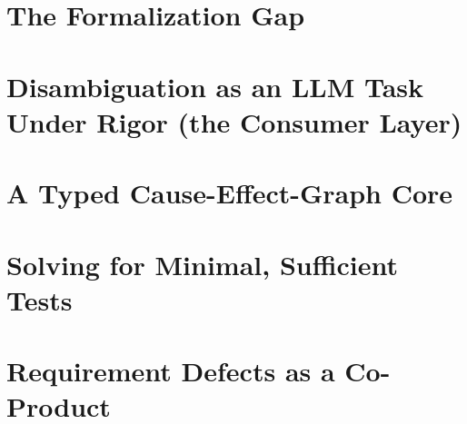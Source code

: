 \documentclass[11pt,a4paper]{article}
\begin{document}
\section{The Formalization Gap}
\label{sec:gap}

\section{Disambiguation as an LLM Task Under Rigor (the Consumer Layer)}
\label{sec:extract}

\section{A Typed Cause-Effect-Graph Core}
\label{sec:ceg}

\section{Solving for Minimal, Sufficient Tests}
\label{sec:solve}

\section{Requirement Defects as a Co-Product}
\label{sec:defects}
\end{document}
